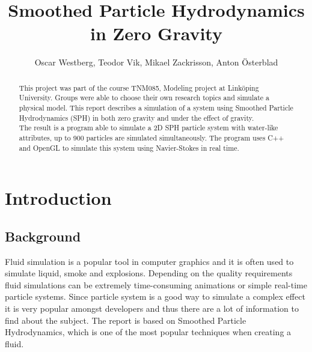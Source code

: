 \documentclass[a4paper,12pt,twoside,final]{report}
\begin{document}
\pagestyle{plain}


\title{Smoothed Particle Hydrodynamics in Zero Gravity}
\author{Oscar Westberg, Teodor Vik, Mikael Zackrisson, Anton Österblad}
\maketitle

\thispagestyle{empty}
\newpage{}

\setcounter{page}{2}
\renewcommand{\abstractname}{Summary}
\begin{abstract}
This project was part of the course TNM085, Modeling project at Linköping University. Groups were able to choose their own research topics and simulate a physical model. This report describes a simulation of a system using Smoothed Particle Hydrodynamics (SPH) in both zero gravity and under the effect of gravity. \\

\noindent The result is a program able to simulate a 2D SPH particle system with water-like attributes, up to 900 particles are simulated simultaneously. The program uses C++ and OpenGL to simulate this system using Navier-Stokes in real time.
\vfill
\end{abstract}
\newpage{}

\tableofcontents  %
\listoffigures    %
\listoftables     %


\chapter{Introduction}


\section{Background}
Fluid simulation is a popular tool in computer graphics and it is often used to simulate liquid, smoke and explosions. Depending on the quality requirements fluid simulations can be extremely time-consuming animations or simple real-time particle systems. Since particle system is a good way to simulate a complex effect it is very popular amongst developers and thus there are a lot of information to find about the subject. The report is based on Smoothed Particle Hydrodynamics, which is one of the most popular techniques when creating a fluid.
\end{document}
